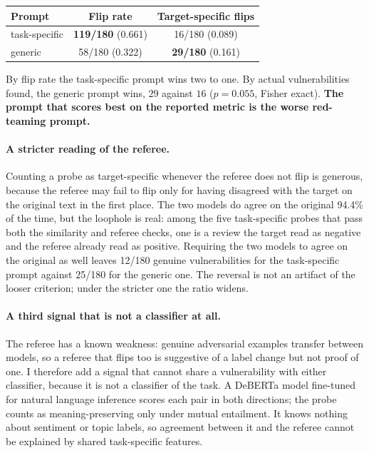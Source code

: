 \documentclass[11pt]{article}
\begin{document}
\begin{center}
\begin{tabular}{lcc}
\toprule
Prompt & Flip rate & Target-specific flips \\
\midrule
task-specific & \textbf{119/180} (0.661) & 16/180 (0.089) \\
generic       & 58/180 (0.322) & \textbf{29/180} (0.161) \\
\bottomrule
\end{tabular}
\end{center}

\noindent By flip rate the task-specific prompt wins two to one. By actual
vulnerabilities found, the generic prompt wins, $29$ against $16$ ($p = 0.055$,
Fisher exact). \textbf{The prompt that scores best on the reported metric is the
worse red-teaming prompt.}

\paragraph{A stricter reading of the referee.}
Counting a probe as target-specific whenever the referee does not flip is
generous, because the referee may fail to flip only for having disagreed with the
target on the original text in the first place. The two models do agree on the
original 94.4\% of the time, but the loophole is real: among the five
task-specific probes that pass both the similarity and referee checks, one is a
review the target read as negative and the referee already read as positive.
Requiring the two models to agree on the original as well leaves 12/180 genuine
vulnerabilities for the task-specific prompt against 25/180 for the generic one.
The reversal is not an artifact of the looser criterion; under the stricter one
the ratio widens.

\paragraph{A third signal that is not a classifier at all.}
The referee has a known weakness: genuine adversarial examples transfer between
models, so a referee that flips too is suggestive of a label change but not proof
of one. I therefore add a signal that cannot share a vulnerability with either
classifier, because it is not a classifier of the task. A DeBERTa model
fine-tuned for natural language inference scores each pair in both directions;
the probe counts as meaning-preserving only under mutual entailment. It knows
nothing about sentiment or topic labels, so agreement between it and the referee
cannot be explained by shared task-specific features.
\end{document}
